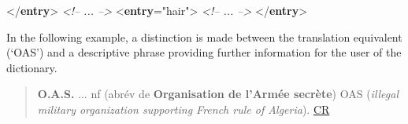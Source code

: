 \begin{shaded}
\hspace*{1em}\hspace*{1em}\mbox{}\newline 
\hspace*{1em}\mbox{}\newline 
{}\mbox{}\newline 
{</\textbf{entry}>}\mbox{}\newline 
\textit{<!-- ... -->}\mbox{}\newline 
{<\textbf{entry}\hspace*{1em}{xml:id}="{hair}">}\mbox{}\newline 
{}\mbox{}\newline 
\textit{<!-- ... -->}\mbox{}\newline 
{}\mbox{}\newline 
{</\textbf{entry}>}\end{shaded}\egroup\par \par
In the following example, a distinction is made between the translation equivalent (‘OAS’) and a descriptive phrase providing further information for the user of the dictionary.
\begin{quote}{\bfseries O.A.S.} ... nf (abrév de {\bfseries Organisation de l'Armée secrète}) OAS ({\itshape illegal military organization supporting French rule of Algeria}). \hyperref[DIC-CR]{CR}\end{quote}
